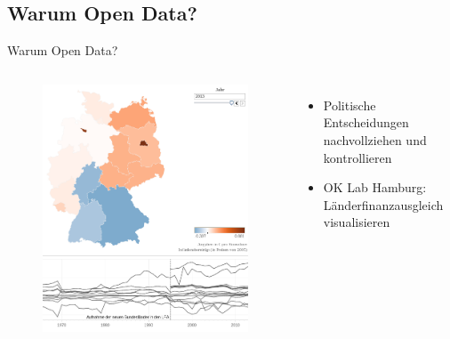 \subsection{Warum Open Data?}
\begin{frame}[t]{Warum Open Data?}
 \begin{columns}
  \begin{figure}[h]
   \centering
   \includegraphics[scale=0.25]{section_open_data_politics.png}
  \end{figure}
  \begin{itemize}
   \item Politische Entscheidungen nachvollziehen und kontrollieren
   \item OK Lab Hamburg: Länderfinanzausgleich visualisieren \cite{Laefi}
  \end{itemize}
 \end{columns}
\end{frame}




